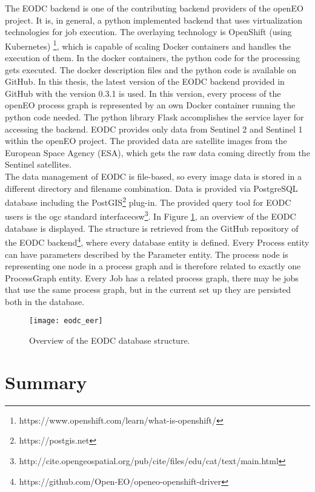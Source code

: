 \documentclass[draft,final]{vutinfth} %
\begin{document}
The EODC backend is one of the contributing backend providers of the openEO project. It is, in general, a python implemented backend that uses virtualization technologies for job execution. The overlaying technology is OpenShift (using Kubernetes) \footnote{https://www.openshift.com/learn/what-is-openshift/}, which is capable of scaling Docker containers and handles the execution of them. In the docker containers, the python code for the processing gets executed. The docker description files and the python code is available on GitHub. In this thesis, the latest version of the EODC backend provided in GitHub with the version 0.3.1 is used. In this version, every process of the openEO process graph is represented by an own Docker container running the python code needed. The python library Flask accomplishes the service layer for accessing the backend. EODC provides only data from Sentinel 2 and Sentinel 1 within the openEO project. The provided data are satellite images from the European Space Agency (ESA), which gets the raw data coming directly from the Sentinel satellites. \\
The data management of EODC is file-based, so every image data is stored in a different directory and filename combination. Data is provided via PostgreSQL database including the PostGIS\footnote{https://postgis.net} plug-in. The provided query tool for EODC users is the \gls{ogc} standard interface\gls{csw}\footnote{http://cite.opengeospatial.org/pub/cite/files/edu/cat/text/main.html}. In Figure \ref{fig:eodceer}, an overview of the EODC database is displayed. The structure is retrieved from the GitHub repository of the EODC backend\footnote{https://github.com/Open-EO/openeo-openshift-driver}, where every database entity is defined. Every Process entity can have parameters described by the Parameter entity. The process node is representing one node in a process graph and is therefore related to exactly one ProcessGraph entity. Every Job has a related process graph, there may be jobs that use the same process graph, but in the current set up they are persisted both in the database.

\begin{figure}[h]
	\centering
	\texttt{[image: eodc\_eer]}
	\caption{Overview of the EODC database structure.}
	\label{fig:eodceer} %
\end{figure}

\section{Summary}
\end{document}
